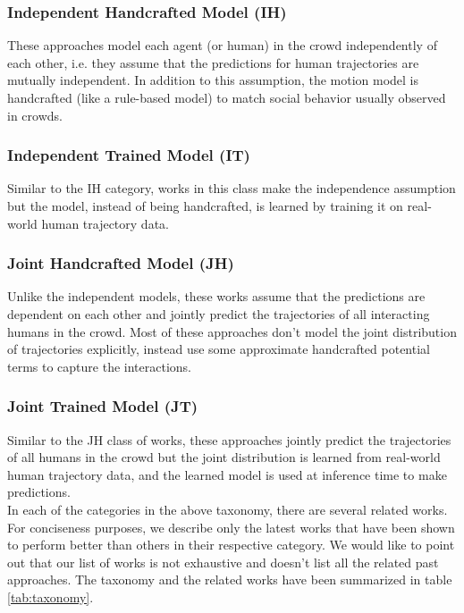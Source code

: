 \subsubsection{Independent Handcrafted Model (IH)}
\label{sec:survey-indep-handcr-model}

These approaches model each agent (or human) in the crowd independently of each other, i.e. they assume that the predictions for human trajectories are mutually independent. In addition to this assumption, the motion model is handcrafted (like a rule-based model) to match social behavior usually observed in crowds.

\subsubsection{Independent Trained Model (IT)}
\label{sec:survey-indep-train-model}

Similar to the IH category, works in this class make the independence assumption but the model, instead of being handcrafted, is learned by training it on real-world human trajectory data.

\subsubsection{Joint Handcrafted Model (JH)}
\label{sec:survey-joint-handcr-model}

Unlike the independent models, these works assume that the predictions are dependent on each other and jointly predict the trajectories of all interacting humans in the crowd. Most of these approaches don't model the joint distribution of trajectories explicitly, instead use some approximate handcrafted potential terms to capture the interactions.

\subsubsection{Joint Trained Model (JT)}
\label{sec:survey-joint-trained-model}

Similar to the JH class of works, these approaches jointly predict the trajectories of all humans in the crowd but the joint distribution is learned from real-world human trajectory data, and the learned model is used at inference time to make predictions. \\




In each of the categories in the above taxonomy, there are several related works. For conciseness purposes, we describe only the latest works that have been shown to perform better than others in their respective category. We would like to point out that our list of works is not exhaustive and doesn't list all the related past approaches. The taxonomy and the related works have been summarized in table \ref{tab:taxonomy}.

